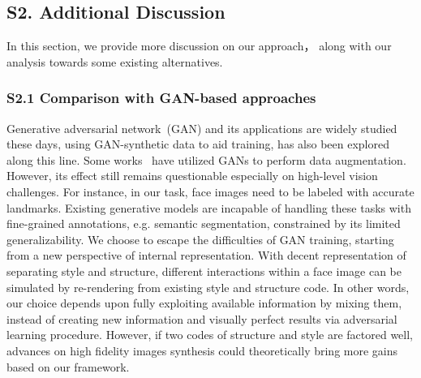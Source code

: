 \documentclass[10pt,twocolumn,letterpaper]{article}
\begin{document}
\begin{table}[htb]
\begin{center}
\vspace{-0.3cm}
\end{center}
\caption{\label{ablation_quantitive} \small{Quantitative ablative results. Normalized mean error (\%) on WFLW test set using different variants of our framework.}}
\vspace{-0.3cm}
\end{table}


\subsection*{S2. Additional Discussion }

In this section, we provide more discussion on our approach， along with our analysis towards some existing alternatives. 


\subsubsection*{S2.1 Comparison with GAN-based approaches}
Generative adversarial network~(GAN) and its applications are widely studied these days, using GAN-synthetic data to aid training, has also been explored along this line. Some works~\cite{antoniou2018data} have utilized GANs to perform data augmentation. However, its effect still remains questionable especially on high-level vision challenges. For instance, in our task, face images need to be labeled with accurate landmarks. Existing generative models are incapable of handling these  tasks with fine-grained annotations, e.g. semantic segmentation, constrained by its limited generalizability. We choose to escape the difficulties of GAN training, starting from a new perspective of internal representation. With decent representation of separating style and structure, different interactions within a face image can be simulated by re-rendering from existing style and structure code. In other words, our choice depends upon fully exploiting available information by mixing them, instead of creating new information and visually perfect results via adversarial learning procedure. However, if two codes of structure and style are factored well, advances on high fidelity images synthesis could theoretically bring more gains based on our framework. 
\end{document}
